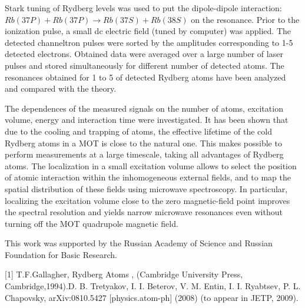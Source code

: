 Stark tuning of Rydberg levels was used to put the dipole-dipole
interaction: $Rb(37P)+Rb(37P)\rightarrow Rb(37S)+ Rb(38S)$ on the
resonance. Prior to the ionization pulse, a small dc electric field
(tuned by computer) was applied. The detected channeltron pulses were
sorted by the amplitudes corresponding to 1-5 detected electrons.
Obtained data were averaged over a large number of laser pulses and
stored simultaneously for different number of detected atoms. The
resonances obtained for 1 to 5 of detected Rydberg atoms have been
analyzed and compared with the theory.

The dependences of the measured
signals on the number of atoms, excitation volume, energy and
interaction time were investigated. It has been shown that due to the
cooling and trapping of atoms, the effective lifetime of the cold
Rydberg atoms in a MOT is close to the natural one. This makes possible
to perform measurements at a large timescale, taking all advantages of
Rydberg atoms. The localization in a small excitation volume allows to
select the position of atomic interaction within the inhomogeneous
external fields, and to map the spatial distribution of these fields
using microwave spectroscopy. In particular, localizing the excitation
volume close to the zero magnetic-field point improves the spectral
resolution and yields narrow microwave resonances even without turning
off the MOT quadrupole magnetic field.

This work was supported by the Russian Academy of Science and
Russian Foundation for Basic Research.

[1] T.F.Gallagher, Rydberg Atoms , (Cambridge
University Press, Cambridge,1994).\newline
[2] D. B. Tretyakov, I. I. Beterov, V. M. Entin, I. I. Ryabtsev, P. L.
Chapovsky, arXiv:0810.5427 [physics.atom-ph] (2008) (to
appear in JETP, 2009).

\vspace{\baselineskip}